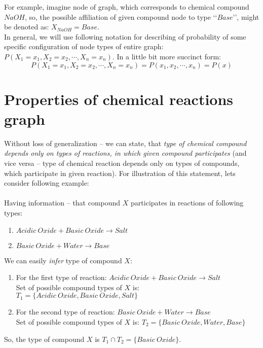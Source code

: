 \documentclass[10pt]{article}
\begin{document}
For example, imagine node of graph, which corresponds to chemical compound $NaOH$, so, the possible affiliation of given compound node to type \lq \lq $Base$\rq \rq, might be denoted as: $X_{NaOH} = Base$.
\\

In general, we will use following notation for describing of probability of some specific configuration of node types of entire graph: $P(X_1 = x_1, X_2 = x_2, \cdots , X_n = x_n)$. In a little bit more succinct form: 
\begin{equation} \label{eq:probability_notation}
P(X_1 = x_1, X_2 = x_2, \cdots , X_n = x_n) = P(x_1, x_2, \cdots , x_n) = P(x)
\end{equation}

\section{Properties of chemical reactions graph}

Without loss of generalization -- we can state, that \emph{type of chemical compound depends only on types of reactions, in which given compound participates} (and vice versa -- type of chemical reaction depends only on types of compounds, which participate in given reaction). For illustration of this statement, lets consider following example: 
\\
\\
Having information -- that compound $X$ participates in reactions of following types:
\begin{enumerate}
    \item $Acidic\ Oxide + Basic\ Oxide \rightarrow Salt$
    \item $Basic\ Oxide + Water \rightarrow Base$
\end{enumerate}
We can easily \emph{infer} type of compound $X$: 
\begin{enumerate}
    \item For the first type of reaction: $Acidic\ Oxide + Basic\ Oxide \rightarrow Salt$ \\
             Set of possible compound types of $X$ is: $T_1 = \{Acidic\ Oxide, Basic\ Oxide, Salt\}$
    \item For the second type of reaction: $Basic\ Oxide + Water \rightarrow Base$ \\
             Set of possible compound types of $X$ is: $T_2 = \{Basic\ Oxide, Water, Base\}$
\end{enumerate}
So, the type of compound $X$ is $T_1 \cap T_2 = \{Basic\ Oxide\}$.
\\
\end{document}
